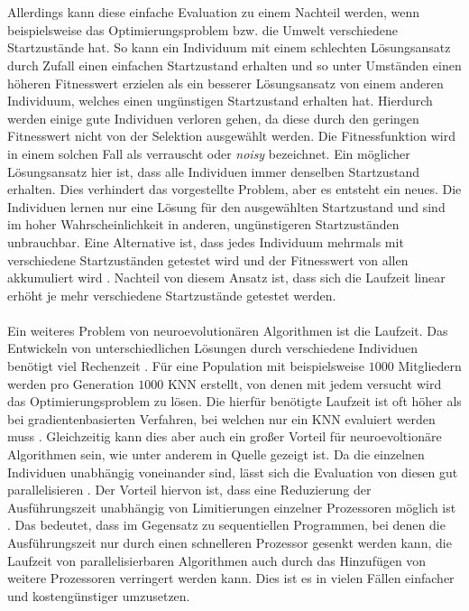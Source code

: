\\\\
Allerdings kann diese einfache Evaluation zu einem Nachteil werden, wenn beispielsweise das Optimierungsproblem bzw. die Umwelt verschiedene Startzustände hat. So kann ein Individuum mit einem schlechten Lösungsansatz durch Zufall einen einfachen Startzustand erhalten und so unter Umständen einen höheren Fitnesswert erzielen als ein besserer Lösungsansatz von einem anderen Individuum, welches einen ungünstigen Startzustand erhalten hat. Hierdurch werden einige gute Individuen verloren gehen, da diese durch den geringen Fitnesswert nicht von der Selektion ausgewählt werden. Die Fitnessfunktion wird in einem solchen Fall als verrauscht oder \emph{noisy} bezeichnet. Ein möglicher Lösungsansatz hier ist, dass alle Individuen immer denselben Startzustand erhalten. Dies verhindert das vorgestellte Problem, aber es entsteht ein neues. Die Individuen lernen nur eine Lösung für den ausgewählten Startzustand und sind im hoher Wahrscheinlichkeit in anderen, ungünstigeren Startzuständen unbrauchbar. Eine Alternative ist, dass jedes Individuum mehrmals mit verschiedene Startzuständen getestet wird und der Fitnesswert von allen akkumuliert wird \cite{whitley1993genetic}. Nachteil von diesem Ansatz ist, dass sich die Laufzeit linear erhöht je mehr verschiedene Startzustände getestet werden.
\\\\
Ein weiteres Problem von neuroevolutionären Algorithmen ist die Laufzeit. Das Entwickeln von unterschiedlichen Lösungen durch verschiedene Individuen benötigt viel Rechenzeit \cite{rojas1996neural}. Für eine Population mit beispielsweise $1000$ Mitgliedern werden pro Generation $1000$ \ac{KNN} erstellt, von denen mit jedem versucht wird das Optimierungsproblem zu lösen. Die hierfür benötigte Laufzeit ist oft höher als bei gradientenbasierten Verfahren, bei welchen nur ein \ac{KNN} evaluiert werden muss \cite{whitley1993genetic}. Gleichzeitig kann dies aber auch ein großer Vorteil für neuroevoltionäre Algorithmen sein, wie unter anderem in Quelle \cite{such2017deep} gezeigt ist. Da die einzelnen Individuen unabhängig voneinander sind, lässt sich die Evaluation von diesen gut parallelisieren \cite{rojas1996neural}. Der Vorteil hiervon ist, dass eine Reduzierung der Ausführungszeit unabhängig von Limitierungen einzelner Prozessoren möglich ist \cite{schleuter1991explicit}. Das bedeutet, dass im Gegensatz zu sequentiellen Programmen, bei denen die Ausführungszeit nur durch einen schnelleren Prozessor gesenkt werden kann, die Laufzeit von parallelisierbaren Algorithmen auch durch das Hinzufügen von weitere Prozessoren verringert werden kann. Dies ist es in vielen Fällen einfacher und kostengünstiger umzusetzen.
